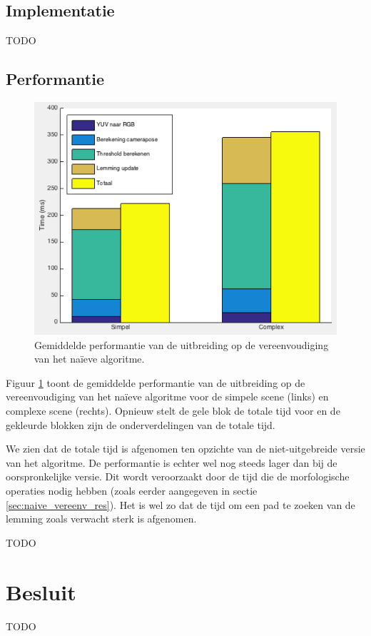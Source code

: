 \subsection{Implementatie} \label{naive_vereenv_impl}

TODO %

\subsection{Performantie}

\begin{figure}
  \centering
  \includegraphics[width=.75\linewidth]{img/naiveTAAPerf}
  \caption{Gemiddelde performantie van de uitbreiding op de vereenvoudiging van het na\"ieve algoritme.}
  \label{fig:naive_uitbr_perf}
\end{figure}

Figuur \ref{fig:naive_uitbr_perf} toont de gemiddelde performantie van de uitbreiding op de vereenvoudiging van het na\"ieve algoritme voor de simpele scene (links) en complexe scene (rechts). Opnieuw stelt de gele blok de totale tijd voor en de gekleurde blokken zijn de onderverdelingen van de totale tijd.

We zien dat de totale tijd is afgenomen ten opzichte van de niet-uitgebreide versie van het algoritme. De performantie is echter wel nog steeds lager dan bij de oorspronkelijke versie. Dit wordt veroorzaakt door de tijd die de morfologische operaties nodig hebben (zoals eerder aangegeven in sectie \ref{sec:naive_vereenv_res}). Het is wel zo dat de tijd om een pad te zoeken van de lemming zoals verwacht sterk is afgenomen.

TODO %

\section{Besluit}
TODO %


